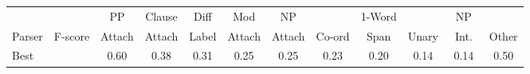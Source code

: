 \begin{table*}[htp]
\small
\renewcommand{\tabcolsep}{1.6mm}
\begin{center}
\begin{tabular}{lccccccccccc}
	\hline
		&
		&
		PP &
		Clause &
		Diff &
		Mod &
		NP &
		&
		1-Word &
		&
		NP &
		\\
		Parser &
		F-score &
		Attach &
		Attach &
		Label &
		Attach &
		Attach &
		Co-ord &
		Span &
		Unary &
		\textcolor{white}{a}Int.\textcolor{white}{a} &
		Other \\
	\hline
	\hline
Best &  & 0.60 & 0.38 & 0.31 & 0.25 & 0.25 & 0.23 & 0.20 & 0.14 & 0.14 & 0.50 \\

\end{tabular}
\end{center}
\end{table*}

